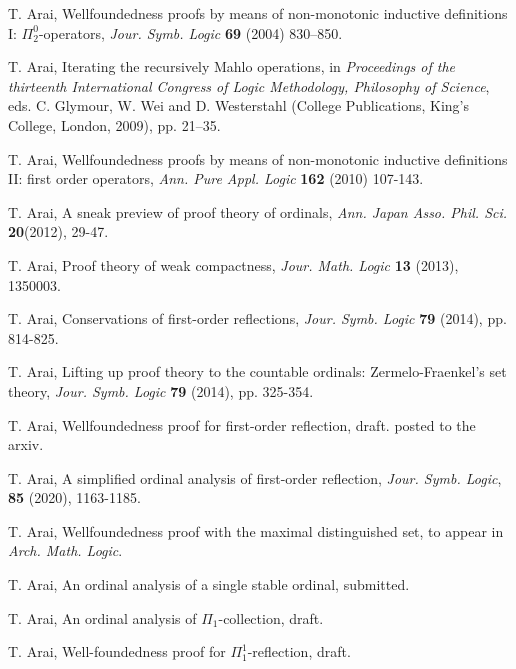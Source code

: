 \documentclass{article}
\begin{document}
\begin{thebibliography}{99}


T. Arai, 
Wellfoundedness proofs by means of non-monotonic inductive definitions I: $\Pi^{0}_{2}$-operators, 
\textit{Jour. Symb. Logic} {\bf 69} (2004) 830--850.


T. Arai, 
Iterating the recursively Mahlo operations,
in \textit{Proceedings of the thirteenth International Congress of Logic Methodology, Philosophy of Science}, 
eds. C. Glymour, W. Wei and D. Westerstahl
(College Publications, King's College, London, 2009), pp. 21--35.

T. Arai, 
Wellfoundedness proofs by means of non-monotonic inductive definitions II: first order operators,
\textit{Ann. Pure Appl. Logic} {\bf 162} (2010) 107-143.


 T. Arai,
A sneak preview of proof theory of ordinals,
\textit{Ann. Japan Asso. Phil. Sci.} \textbf{20}(2012), 29-47.


T. Arai, 
Proof theory of weak compactness, 
\textit{Jour. Math. Logic} {\bf 13} (2013), 1350003.


T. Arai, 
Conservations of first-order reflections,
 \textit{Jour. Symb. Logic} {\bf 79} (2014), pp. 814-825.
 


T. Arai, 
Lifting up proof theory to the countable ordinals: Zermelo-Fraenkel's set theory,
 \textit{Jour. Symb. Logic} {\bf 79} (2014), pp. 325-354.


T. Arai,
Wellfoundedness proof for first-order reflection,
draft.
posted to the arxiv.

T. Arai, A simplified ordinal analysis of first-order reflection,
\textit{Jour. Symb. Logic}, {\bf 85} (2020), 1163-1185.


T. Arai,
Wellfoundedness proof with the maximal distinguished set,
to appear in \textit{Arch. Math. Logic}.

T. Arai,
An ordinal analysis of a single stable ordinal,
submitted.

T. Arai,
An ordinal analysis of $\Pi_{1}$-collection, draft.

T. Arai,
Well-foundedness proof for $\Pi^{1}_{1}$-reflection,
draft.



\end{thebibliography}
\end{document}
